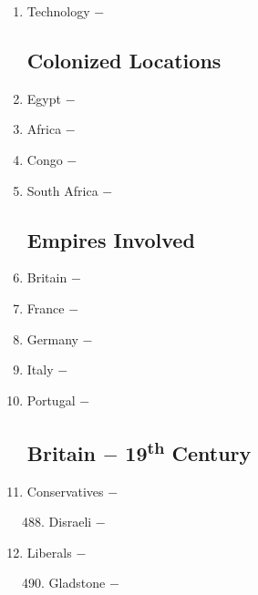 \documentclass[12pt]{article}
\begin{document}
\begin{enumerate}
\item Technology $-$ 

\subsection{Colonized Locations}

\item Egypt $-$

\item Africa $-$ 

\item Congo $-$ 

\item South Africa $-$ 

\subsection{Empires Involved}

\item Britain $-$ 

\item France $-$ 

\item Germany $-$ 

\item Italy $-$ 

\item Portugal $-$ 

\subsection{Britain $-$ 19\textsuperscript{th} Century}

\item Conservatives $-$ 

\begin{enumerate}[label=\arabic{*}.]
\setcounter{enumii}{487}

\item Disraeli $-$

\end{enumerate}
\setcounter{enumi}{488}

\item Liberals $-$ 

\begin{enumerate}[label=\arabic{*}.]
\setcounter{enumii}{489}

\item Gladstone $-$

\end{enumerate}
\setcounter{enumi}{490}


\end{enumerate}
\end{document}
